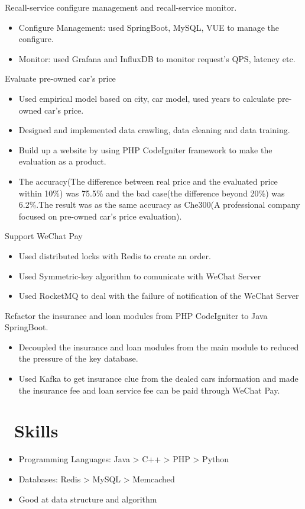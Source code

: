 \documentclass{resume}
\begin{document}
Recall-service configure management and recall-service monitor.
\begin{itemize}
  \item Configure Management: used SpringBoot, MySQL, VUE to manage the configure.
  \item Monitor: used Grafana and InfluxDB to monitor request's QPS, latency etc.
\end{itemize}

Evaluate pre-owned car's price
\begin{itemize}
  \item Used empirical model based on city, car model, used years to calculate pre-owned car's price.
  \item Designed and implemented data crawling, data cleaning and data training.
  \item Build up a website by using PHP CodeIgniter framework to make the evaluation as a product.
  \item The accuracy(The difference between real price and the evaluated price within 10\%) was 75.5\% and the bad case(the difference beyond 20\%) was 6.2\%.The result was as the same accuracy as Che300(A professional company focused on pre-owned car's price evaluation).
\end{itemize}

Support WeChat Pay
\begin{itemize}
  \item Used distributed locks with Redis to create an order.
  \item Used Symmetric-key algorithm to comunicate with WeChat Server
  \item Used RocketMQ to deal with the failure of notification of the WeChat Server
\end{itemize}

Refactor the insurance and loan modules from PHP CodeIgniter to Java SpringBoot.
\begin{itemize}
  \item Decoupled the insurance and loan modules from the main module to reduced the pressure of the key database.
  \item Used Kafka to get insurance clue from the dealed cars information and made the insurance fee and loan service fee can be paid through WeChat Pay.
\end{itemize}

\section{\faCogs\ Skills}
\begin{itemize}[parsep=0.5ex]
  \item Programming Languages: Java > C++ > PHP > Python
  \item Databases: Redis > MySQL > Memcached
  \item Good at data structure and algorithm
\end{itemize}
\end{document}
